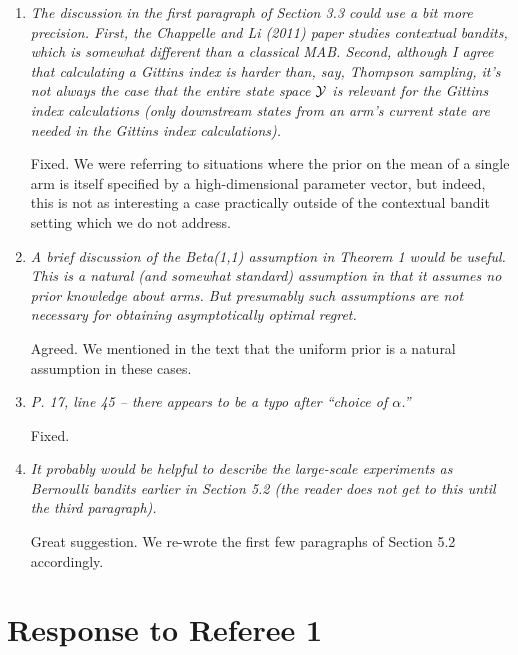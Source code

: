 \documentclass[11pt]{article}
\newcommand{\1}{\ensuremath{\mathbf{1}}} %
\theoremstyle{thm-sf}
\begin{document}
\begin{enumerate}
		
	\item {\it The discussion in the first paragraph of Section 3.3 could use a bit more precision. First, the Chappelle and Li (2011) paper studies contextual bandits, which is somewhat different than a classical MAB. Second, although I agree that calculating a Gittins index is harder than, say, Thompson sampling, it’s not always the case that the entire state space $\cal{Y}$ is relevant for the Gittins index calculations (only downstream states from an arm’s current state are needed in the Gittins index calculations).}
	
	Fixed. We were referring to situations where the prior on the mean of a single arm is itself specified by a high-dimensional parameter vector, but indeed, this is not as interesting a case practically outside of the contextual bandit setting which we do not address. 
	
	\item {\it A brief discussion of the Beta(1,1) assumption in Theorem 1 would be useful. This is a natural (and somewhat standard) assumption in that it assumes no prior knowledge about arms. But presumably such assumptions are not necessary for obtaining asymptotically optimal regret.
	}

	Agreed. We mentioned in the text that the uniform prior is a natural assumption in these cases.
	
	\item {\it  P. 17, line 45 – there appears to be a typo after “choice of $\alpha$.”}
	
	Fixed.
	
	\item {\it It probably would be helpful to describe the large-scale experiments as Bernoulli bandits earlier in Section 5.2 (the reader does not get to this until the third paragraph).}
	
	Great suggestion. We re-wrote the first few paragraphs of Section 5.2 accordingly.
	\end{enumerate}
	
	\newpage
	\section{Response to  Referee 1}
	
\end{document}
